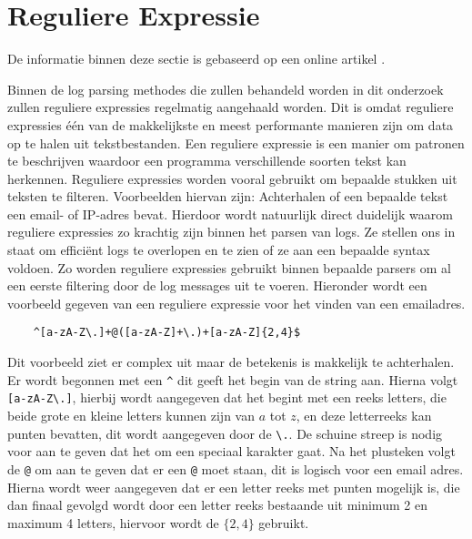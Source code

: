 \section{Reguliere Expressie}
\label{section:reguliereexpressie}
De informatie binnen deze sectie is gebaseerd op een online artikel \autocite{regexwebsite}.

Binnen de log parsing methodes die zullen behandeld worden in dit onderzoek zullen reguliere expressies regelmatig aangehaald worden. Dit is omdat reguliere expressies één van de makkelijkste en meest performante manieren zijn om data op te halen uit tekstbestanden. Een reguliere expressie is een manier om patronen te beschrijven waardoor een programma verschillende soorten tekst kan herkennen. Reguliere expressies worden vooral gebruikt om bepaalde stukken uit teksten te filteren. Voorbeelden hiervan zijn: Achterhalen of een bepaalde tekst een email- of IP-adres bevat. Hierdoor wordt natuurlijk direct duidelijk waarom reguliere expressies zo krachtig zijn binnen het parsen van logs. Ze stellen ons in staat om efficiënt logs te overlopen en te zien of ze aan een bepaalde syntax voldoen. Zo worden reguliere expressies gebruikt binnen bepaalde parsers om al een eerste filtering door de log messages uit te voeren. Hieronder wordt een voorbeeld gegeven van een reguliere expressie voor het vinden van een emailadres.
\begin{verbatim}
    ^[a-zA-Z\.]+@([a-zA-Z]+\.)+[a-zA-Z]{2,4}$
\end{verbatim}

Dit voorbeeld ziet er complex uit maar de betekenis is makkelijk te achterhalen. Er wordt begonnen met een \verb!^! dit geeft het begin van de string aan. Hierna volgt \verb![a-zA-Z\.]!, hierbij wordt aangegeven dat het begint met een reeks letters, die beide grote en kleine letters kunnen zijn van \(a\) tot \(z\), en deze letterreeks kan punten bevatten, dit wordt aangegeven door de \verb!\.!. De schuine streep is nodig voor aan te geven dat het om een speciaal karakter gaat. Na het plusteken volgt de \verb!@! om aan te geven dat er een \verb!@! moet staan, dit is logisch voor een email adres. Hierna wordt weer aangegeven dat er een letter reeks met punten mogelijk is, die dan finaal gevolgd wordt door een letter reeks bestaande uit minimum 2 en maximum 4 letters, hiervoor wordt de \(\{2,4\}\) gebruikt.\\

